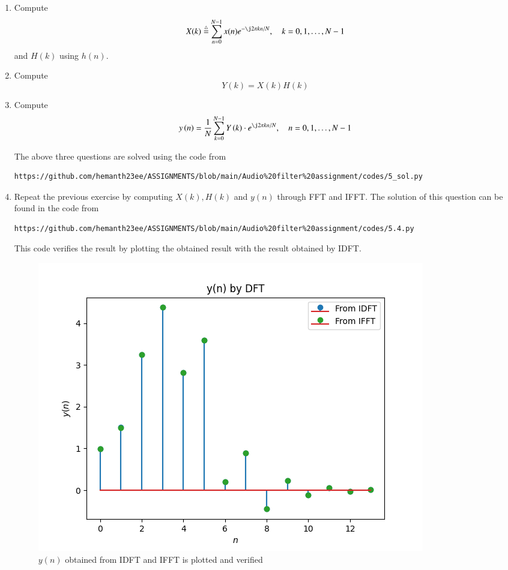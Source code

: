 \documentclass[journal,12pt,twocolumn]{IEEEtran}
\newcommand{\define}{\stackrel{\triangle}{=}}
\theoremstyle{remark}
\begin{document}
\begin{enumerate}
\item
Compute
\begin{equation}
X(k) \define \sum _{n=0}^{N-1}x(n) e^{-\j2\pi kn/N}, \quad k = 0,1,\dots, N-1
\end{equation}
and $H(k)$ using $h(n)$.
\item Compute 
\begin{equation}
Y(k) = X(k)H(k)
\label{fp.46}
\end{equation}
\item Compute
\begin{equation}
y\brak{n}={\frac {1}{N}}\sum _{k=0}^{N-1}Y\brak{k}\cdot e^{\j 2\pi kn/N},\quad n = 0,1,\dots, N-1
\label{inv-ft.46}
\end{equation}

\solution The above three questions are solved using the code from
\begin{lstlisting}
https://github.com/hemanth23ee/ASSIGNMENTS/blob/main/Audio%20filter%20assignment/codes/5_sol.py
\end{lstlisting}

\item Repeat the previous exercise by computing $X(k), H(k)$ and $y(n)$ through FFT and IFFT.
\solution The solution of this question can be found in the code from
\begin{lstlisting}
https://github.com/hemanth23ee/ASSIGNMENTS/blob/main/Audio%20filter%20assignment/codes/5.4.py  
\end{lstlisting}
This code verifies the result by plotting the obtained result with the result obtained by IDFT.
\begin{figure}[H]
\centering
\includegraphics[width=\columnwidth]{figs/yn_verf_5.4.png}
\caption{$y(n)$ obtained from IDFT and IFFT is plotted and verified}
\label{yn_verf_5.4.46}
\end{figure}


\end{enumerate}
\end{document}

